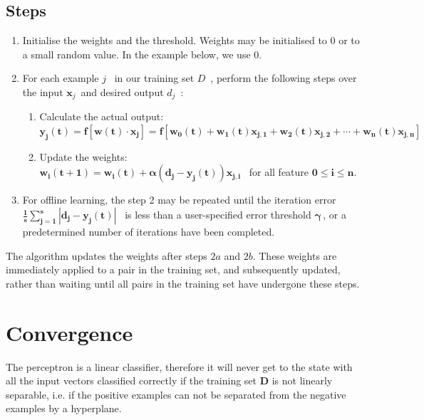 \documentclass[12pt, right open]{memoir}
\begin{document}
\subsection{Steps}

\begin{enumerate}

\item Initialise the weights and the threshold. Weights may be initialised to $0$ or to a small random value. In the example below, we use $0$.

\item  For each example $j$ \, in our training set $D$ \,, perform the following steps over the input $\mathbf{x}_j$\, and desired output $d_j$ \,:

\begin{enumerate}
\item Calculate the actual output: \hfill \\
$\mathbf{y_j(t) = f[\mathbf{w}(t)\cdot\mathbf{x}_j] = f[w_0(t) + w_1(t)x_{j,1} + w_2(t)x_{j,2} + \dotsb + w_n(t)x_{j,n}]}$
\item Update the weights: \hfill \\
$\mathbf{w_i(t+1) = w_i(t) + \alpha (d_j - y_j(t)) x_{j,i}}$ \, for all feature $\mathbf{0 \leq i \leq n}$.
\end{enumerate}

\item  For offline learning, the step 2 may be repeated until the iteration error 
$\mathbf{\frac{1}{s} \sum_{j=1}^s |d_j - y_j(t)|}$ \, is less than a user-specified error threshold $\mathbf{\gamma}$\,, or a predetermined number of iterations have been completed.

\end{enumerate}

The algorithm updates the weights after steps $2a$ and $2b$. These weights are immediately applied to a pair in the training set, and subsequently updated, rather than waiting until all pairs in the training set have undergone these steps.

\section{Convergence}
The perceptron is a linear classifier, therefore it will never get to the state with all the input vectors classified correctly if the training set $\mathbf{D}$ is not linearly separable, i.e. if the positive examples can not be separated from the negative examples by a hyperplane.
\end{document}
